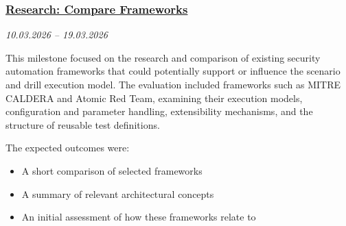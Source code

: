 \subsubsection{\href{https://gitlab.ti.bfh.ch/groups/gausf1-vonal3/-/milestones/16}{Research: Compare Frameworks}}\label{subsubsec:milestone-research-compare-frameworks}
\textit{10.03.2026 -- 19.03.2026}

This milestone focused on the research and comparison of existing security automation frameworks that could potentially support or influence the  scenario and drill execution model.
The evaluation included frameworks such as MITRE CALDERA and Atomic Red Team, examining their execution models, configuration and parameter handling, extensibility mechanisms, and the structure of reusable test definitions.

The expected outcomes were:
\begin{itemize}
    \item[$\checkmark$] A short comparison of selected frameworks
    \item[$\checkmark$] A summary of relevant architectural concepts
    \item[$\checkmark$] An initial assessment of how these frameworks relate to 
\end{itemize}
